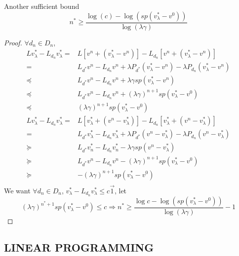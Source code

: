 \begin{proposition}
    Another sufficient bound
    \[
        n^* \ge \frac{ \log(c) - \log(sp(v^*_\lambda - v^0))}{ \log (\lambda \gamma)} 
    \]
    \begin{proof} $ \forall d_n \in D_n $,
        \begin{align*}
            Lv^{*}_{\lambda} - L_{d_n} v^{*}_{\lambda}
            =& L\left[ v^n + (v^*_{\lambda} - v^n) \right] - L_{d_n}\left[ v^n + (v^*_{\lambda} - v^n) \right]\\
            =& L_{d^*} v^n - L_{d_n} v^n + \lambda P_{d^*} (v^{*}_{\lambda} - v^n) - \lambda P_{d_n} (v^*_{\lambda} - v^n)\\
            \preceq& L_{d^*}v^n - L_{d_n} v^n + \lambda \gamma sp(v^*_{\lambda} - v^n)\\
            \preceq&  L_{d^*}v^n - L_{d_n} v^n + {(\lambda \gamma)}^{n+1} sp(v^*_{\lambda} - v^0)\\
            \preceq& {(\lambda \gamma)}^{n+1} sp(v^*_{\lambda} - v^0)
        \end{align*}
        \begin{align*}
            Lv^{*}_{\lambda} - L_{d_n} v^{*}_{\lambda}
            =& L\left[ v^*_{\lambda} + (v^n - v^*_{\lambda}) \right] - L_{d_n}\left[ v^*_{\lambda} + (v^n - v^*_{\lambda}) \right]\\
            =& L_{d^*} v^*_\lambda - L_{d_n} v^{*}_{\lambda} + \lambda P_{d^*} ( v^n - v^{*}_{\lambda}) - \lambda P_{d_n} ( v^n - v^*_{\lambda})\\
            \succeq& L_{d^*}v^*_{n} - L_{d_n} v^*_{n} - \lambda \gamma sp(v^n - v^*_{\lambda})\\
            \succeq&  L_{d^*}v^n - L_{d_n} v^n - {(\lambda \gamma)}^{n+1} sp(v^*_{\lambda} - v^0)\\
            \succeq& - {(\lambda \gamma)}^{n+1} sp(v^*_{\lambda} - v^0)\\
        \end{align*}
        We want $ \forall d_n \in D_n $, $ v^*_{\lambda} - L_{d_n} v^*_{\lambda} \le c \vec{1} $, let
        \[
            {(\lambda \gamma)}^{n^*+1} sp(v^*_{\lambda} - v^0) \le c
            \Rightarrow n^* \ge  \frac{\log c - \log(sp(v^*_{\lambda} - v^0))}{ \log(\lambda \gamma)} - 1
        \]
    \end{proof}
\end{proposition}

\subsection{LINEAR PROGRAMMING}%
\label{sub:linear_programming}

